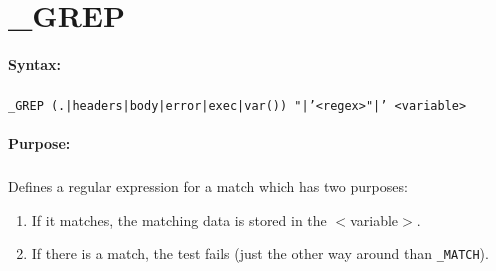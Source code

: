 
\newpage
\section{\_GREP}
\label{cmd:_GREP}

\paragraph{Syntax:}
\subparagraph{}
\texttt{\_GREP (.|headers|body|error|exec|var()) "|'<regex>"|' <variable>}

\paragraph{Purpose:}
\subparagraph{}
Defines a regular expression for a match which has two purposes:

\begin{enumerate}
\item If it matches, the matching data is stored in the $<$variable$>$.
\item If there is a match, the test fails (just the other way around than \texttt{\_MATCH}).
\end{enumerate}
